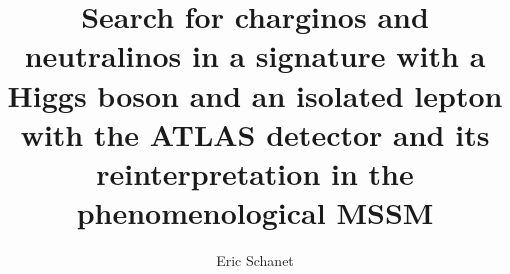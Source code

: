 
\newcommand{\myTitle}{Search for charginos and neutralinos in a signature with a Higgs boson and an isolated lepton with the ATLAS detector and its reinterpretation in the phenomenological MSSM}
\title{\myTitle}


\author{Eric Schanet}








